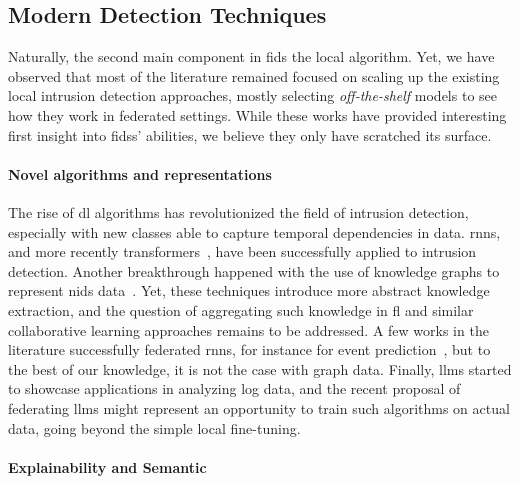 \subsection{Modern Detection Techniques\label{sec:conclusion.perspectives.detection}}

Naturally, the second main component in \gls{fids} the local algorithm.
Yet, we have observed that most of the literature remained focused on scaling up the existing local intrusion detection approaches, mostly selecting \emph{off-the-shelf} models to see how they work in federated settings.
While these works have provided interesting first insight into \glspl{fids}' abilities, we believe they only have scratched its surface.

\paragraph{Novel algorithms and representations}
The rise of \gls{dl} algorithms has revolutionized the field of intrusion detection, especially with new classes able to capture temporal dependencies in data.
\Glspl{rnn}, and more recently transformers~\needref, have been successfully applied to intrusion detection.
Another breakthrough happened with the use of knowledge graphs to represent \gls{nids} data~\cite{leichtnam_Sec2graphNetworkAttack_2020}.
Yet, these techniques introduce more abstract knowledge extraction, and the question of aggregating such knowledge in \gls{fl} and similar collaborative learning approaches remains to be addressed.
A few works in the literature successfully federated \glspl{rnn}, for instance for event prediction~\cite{naseri_CerberusExploringFederated_2022}, but to the best of our knowledge, it is not the case with graph data.
Finally, \glspl{llm} started to showcase applications in analyzing log data, and the recent proposal of federating \glspl{llm} might represent an opportunity to train such algorithms on actual data, going beyond the simple local fine-tuning.


\paragraph{Explainability and Semantic}

